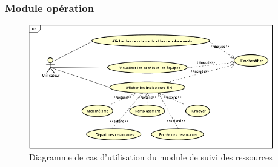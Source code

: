 \newpage
\subsubsection{Module opération}
\begin{figure}[h!]  
  \centering
    \includegraphics[width=0.95\textwidth]{chapitre2/Figures/ressourcesUC.png}
  \caption{Diagramme de cas d’utilisation du module de suivi des ressources}
\end{figure}
